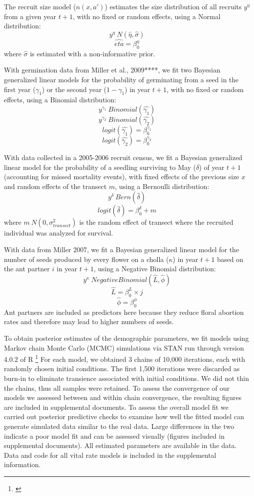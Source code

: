 \documentclass[11pt]{article}
\newcommand{\tom}[2]{{\color{red}{#1}}\footnote{\textit{\color{red}{#2}}}}
\begin{document}
The recruit size model ($n(x,a')$) estimates the size distribution of all recruits $y^{\eta}$ from a given year $t+1$, with no fixed or random effects, using a Normal distribution: 
$$y^{\eta} ~ N(\hat{\eta},\hat{\sigma})$$
$$\hat{eta} = \beta_{0}^{\eta}$$
where $\hat{\sigma}$ is estimated with a non-informative prior. 

With germination data from Miller et al., 2009****, we fit two Bayesian generalized linear models for the probability of germinating from a seed in the first year ($\gamma_1$) or the second year ($1 - \gamma_1$) in year $t+1$, with no fixed or random effects, using a Binomial distribution:
$$y^{\gamma_1} ~ Binomial(\hat{\gamma_1})$$
$$y^{\gamma_2} ~ Binomial(\hat{\gamma_2})$$
$$logit(\hat{\gamma_1}) = \beta_{0}^{\gamma_1}$$
$$logit(\hat{\gamma_2}) = \beta_{0}^{\gamma_2}$$

With data collected in a 2005-2006 recruit census, we fit a Bayesian generalized linear model for the probability of a seedling surviving to May ($\delta$) of year $t+1$ (accounting for missed mortality events), with fixed effects of the previous size $x$ and random effects of the transect $m$, using a Bernoulli distribution: 
$$y^{\delta} ~ Bern(\hat{\delta})$$
$$logit(\hat{\delta}) = \beta_{0}^{\delta} + m$$
 where $m ~ N(0, \sigma_{transect}^2)$ is the random effect of transect where the recruited individual was analyzed for survival.

With data from Miller 2007, we fit a Bayesian generalized linear model for the number of seeds produced by every flower on a cholla ($\kappa$) in year $t+1$ based on the ant partner $i$ in year $t+1$, using a Negative Binomial distribution:
$$y^{\kappa} ~ Negative Binomial(\hat{L},\hat{\phi})$$
$$\hat{L} = \beta_{0}^{L} \times j$$
$$\hat{\phi} = \beta_{0}^{\phi}$$
Ant partners are included as predictors here because they reduce floral abortion rates and therefore may lead to higher numbers of seeds. 

To obtain posterior estimates of the demographic parameters, we fit models using Markov chain Monte Carlo (MCMC) simulations via STAN run through version 4.0.2 of R \tom{}{You need to cite R and RStan}
For each model, we obtained 3 chains of 10,000 iterations, each with randomly chosen initial conditions. 
The first 1,500 iterations were discarded as burn-in to eliminate transience associated with initial conditions. 
We did not thin the chains, thus all samples were retained. 
To assess the convergence of our models we assessed between and within chain convergence, the resulting figures are included in supplemental documents. 
To assess the overall model fit we carried out posterior predictive checks to examine how well the fitted model can generate simulated data similar to the real data.
Large differences in the two indicate a poor model fit and can be assessed visually (figures included in supplemental documents). 
All estimated parameters are available in the data. 
Data and code for all vital rate models is included in the supplemental information.
\end{document}
